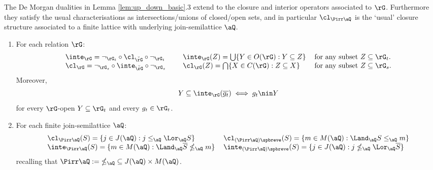 \documentclass{article}
\begin{document}
The De Morgan dualities in Lemma \ref{lem:up_down_basic}.3 extend to the closure and interior operators associated to $\rG$. Furthermore they satisfy the usual characterisations as intersections/unions of closed/open sets, and in particular $\cl_{\Pirr\aQ}$ is the `usual' closure structure associated to a finite lattice with underlying join-semilattice $\aQ$.

\begin{lemma}
\label{lem:cl_inte_of_pirr}
\item
\begin{enumerate}
\item
For each relation $\rG$:
\[
\begin{tabular}{llll}
$\inte_\rG = \neg_{\rG_t} \circ \cl_{\breve{\rG}} \circ \neg_{\rG_t}$
&\qquad&
$\inte_\rG(Z) = \bigcup \{ Y \in O(\rG) : Y \subseteq Z \}$
& for any subset $Z \subseteq \rG_t$.
\\
$\cl_\rG = \neg_{\rG_s} \circ \inte_{\breve{\rG}} \circ \neg_{\rG_s}$
&\qquad&
$\cl_\rG(Z) = \bigcap \{ X \in C(\rG) : Z \subseteq X \}$
& for any subset $Z \subseteq \rG_s$.
\end{tabular}
\]
Moreover,
\[
Y \subseteq \inte_\rG(\overline{g_t})
\iff
g_t \nin Y
\]
for every $\rG$-open $Y \subseteq \rG_t$ and every $g_t \in \rG_t$.
 

\item
For each finite join-semilattice $\aQ$:
\[
\begin{tabular}{ll}
$\cl_{\Pirr\aQ} (S) = \{ j \in J(\aQ) : j \leq_\aQ \Lor_\aQ S \}$
&
$\cl_{(\Pirr\aQ)\spbreve} (S) = \{ m \in M(\aQ) : \Land_\aQ S \leq_\aQ m \}$
\\
$\inte_{\Pirr\aQ} (S) = \{ m \in M(\aQ) : \Land_\aQ \overline{S} \nleq_\aQ m \}$
&
$\inte_{(\Pirr\aQ)\spbreve} (S) = \{ j \in J(\aQ) : j \nleq_\aQ \Lor_\aQ \overline{S} \}$
\end{tabular}
\]
recalling that $\Pirr\aQ := \; \nleq_\aQ \; \subseteq J(\aQ) \times M(\aQ)$.

\end{enumerate}
\end{lemma}
\end{document}
